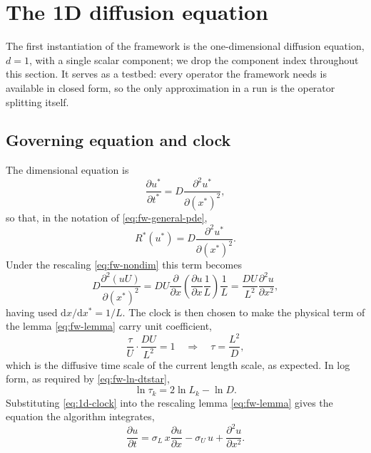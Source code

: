 \documentclass{article}
\begin{document}
\section{The 1D diffusion equation}\label{sec:1d}

The first instantiation of the framework is the one-dimensional diffusion
equation, $d = 1$, with a single scalar component; we drop the component index
throughout this section. It serves as a testbed: every operator the framework
needs is available in closed form, so the only approximation in a run is the
operator splitting itself.

\subsection{Governing equation and clock}\label{ssec:1d-clock}

The dimensional equation is
\begin{equation}\label{eq:1d-dimensional}
  \frac{\partial u^*}{\partial t^*} = D \frac{\partial^2 u^*}{\partial (x^*)^2},
\end{equation}
so that, in the notation of \eqref{eq:fw-general-pde},
\begin{equation}\label{eq:1d-rhs}
  R^*(u^*) = D \frac{\partial^2 u^*}{\partial (x^*)^2}.
\end{equation}
Under the rescaling \eqref{eq:fw-nondim} this term becomes
\begin{equation}\label{eq:1d-rhs-rescaled}
  D \frac{\partial^2 (u U)}{\partial (x^*)^2}
  = D U \frac{\partial}{\partial x}\!\left( \frac{\partial u}{\partial x} \frac{1}{L} \right) \frac{1}{L}
  = \frac{D U}{L^2} \frac{\partial^2 u}{\partial x^2},
\end{equation}
having used $\mathrm{d}x/\mathrm{d}x^* = 1/L$. The clock is then chosen to make
the physical term of the lemma \eqref{eq:fw-lemma} carry unit coefficient,
\begin{equation}\label{eq:1d-clock}
  \frac{\tau}{U} \cdot \frac{D U}{L^2} = 1
  \quad\Longrightarrow\quad
  \tau = \frac{L^2}{D},
\end{equation}
which is the diffusive time scale of the current length scale, as expected.
In log form, as required by \eqref{eq:fw-ln-dtstar},
\begin{equation}\label{eq:1d-ln-clock}
  \ln \tau_k = 2 \ln L_k - \ln D .
\end{equation}
Substituting \eqref{eq:1d-clock} into the rescaling lemma
\eqref{eq:fw-lemma} gives the equation the algorithm integrates,
\begin{equation}\label{eq:1d-transformed}
  \frac{\partial u}{\partial t}
  = \sigma_L\, x \frac{\partial u}{\partial x}
  - \sigma_U\, u
  + \frac{\partial^2 u}{\partial x^2}.
\end{equation}
\end{document}
